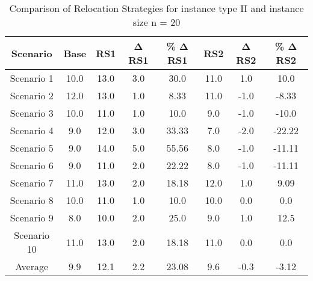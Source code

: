 \begin{table}[H]
\centering
\begin{tabular}{cccccccc}
  \hline
  \textbf{Scenario} & \textbf{Base} & \textbf{RS1} & \textbf{Δ RS1} & \textbf{\% Δ RS1} & \textbf{RS2} & \textbf{Δ RS2} & \textbf{\% Δ RS2} \\\hline
  Scenario 1 & 10.0 & 13.0 & 3.0 & 30.0 & 11.0 & 1.0 & 10.0 \\
  Scenario 2 & 12.0 & 13.0 & 1.0 & 8.33 & 11.0 & -1.0 & -8.33 \\
  Scenario 3 & 10.0 & 11.0 & 1.0 & 10.0 & 9.0 & -1.0 & -10.0 \\
  Scenario 4 & 9.0 & 12.0 & 3.0 & 33.33 & 7.0 & -2.0 & -22.22 \\
  Scenario 5 & 9.0 & 14.0 & 5.0 & 55.56 & 8.0 & -1.0 & -11.11 \\
  Scenario 6 & 9.0 & 11.0 & 2.0 & 22.22 & 8.0 & -1.0 & -11.11 \\
  Scenario 7 & 11.0 & 13.0 & 2.0 & 18.18 & 12.0 & 1.0 & 9.09 \\
  Scenario 8 & 10.0 & 11.0 & 1.0 & 10.0 & 10.0 & 0.0 & 0.0 \\
  Scenario 9 & 8.0 & 10.0 & 2.0 & 25.0 & 9.0 & 1.0 & 12.5 \\
  Scenario 10 & 11.0 & 13.0 & 2.0 & 18.18 & 11.0 & 0.0 & 0.0 \\
  Average & 9.9 & 12.1 & 2.2 & 23.08 & 9.6 & -0.3 & -3.12 \\\hline
\end{tabular}
\caption{Comparison of Relocation Strategies for instance type II and instance size n = 20}
\label{tab:wait:resrelocation-comparison_II_20}
\end{table}
